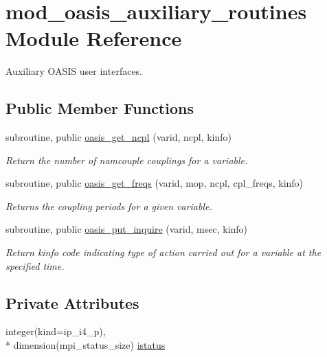 \hypertarget{classmod__oasis__auxiliary__routines}{\section{mod\+\_\+oasis\+\_\+auxiliary\+\_\+routines Module Reference}
\label{classmod__oasis__auxiliary__routines}
}


Auxiliary O\+A\+S\+I\+S user interfaces.  


\subsection*{Public Member Functions}
\begin{DoxyCompactItemize}
\item 
subroutine, public \hyperlink{classmod__oasis__auxiliary__routines_a154d3345ef9691e378afdc871086f7eb}{oasis\+\_\+get\+\_\+ncpl} (varid, ncpl, kinfo)
\begin{DoxyCompactList}\small\item\em Return the number of namcouple couplings for a variable. \end{DoxyCompactList}\item 
subroutine, public \hyperlink{classmod__oasis__auxiliary__routines_a62d1c98c05bcc4bd5e8796866bcce2db}{oasis\+\_\+get\+\_\+freqs} (varid, mop, ncpl, cpl\+\_\+freqs, kinfo)
\begin{DoxyCompactList}\small\item\em Returns the coupling periods for a given variable. \end{DoxyCompactList}\item 
subroutine, public \hyperlink{classmod__oasis__auxiliary__routines_a7a95eb579171b6c2f06ff532c7823e2e}{oasis\+\_\+put\+\_\+inquire} (varid, msec, kinfo)
\begin{DoxyCompactList}\small\item\em Return kinfo code indicating type of action carried out for a variable at the specified time. \end{DoxyCompactList}\end{DoxyCompactItemize}
\subsection*{Private Attributes}
\begin{DoxyCompactItemize}
\item 
integer(kind=ip\+\_\+i4\+\_\+p), \\*
dimension(mpi\+\_\+status\+\_\+size) \hyperlink{classmod__oasis__auxiliary__routines_a284fcb0384dbbf081a6930256fc12b27}{istatus}
\end{DoxyCompactItemize}


